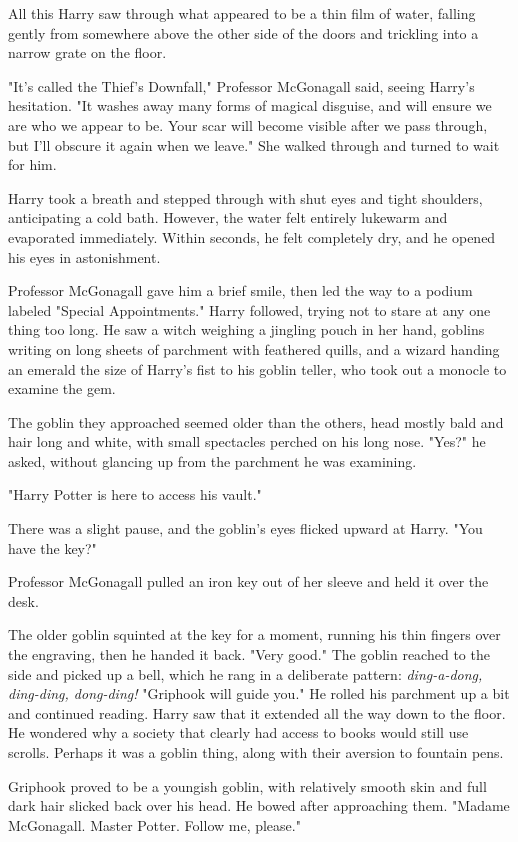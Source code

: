 All this Harry saw through what appeared to be a thin film
of water, falling gently from somewhere above the other
side of the doors and trickling into a narrow grate on the floor.

"It's called the Thief's Downfall," Professor McGonagall said,
seeing Harry's hesitation. "It washes away many forms of
magical disguise, and will ensure we are who we appear
to be. Your scar will become visible after we pass through,
but I'll obscure it again when we leave." She walked
through and turned to wait for him.

Harry took a breath and stepped through with shut eyes and tight
shoulders, anticipating a cold bath. However, the water felt entirely
lukewarm and evaporated immediately. Within seconds, he felt completely
dry, and he opened his eyes in astonishment.

Professor McGonagall gave him a brief smile, then led the
way to a podium labeled "Special Appointments." Harry
followed, trying not to stare at any one thing too long. He
saw a witch weighing a jingling pouch in her hand, goblins
writing on long sheets of parchment with feathered quills,
and a wizard handing an emerald the size of Harry's fist
to his goblin teller, who took out a monocle to examine the gem.

The goblin they approached seemed older than the others,
head mostly bald and hair long and white, with small
spectacles perched on his long nose. "Yes?" he asked,
without glancing up from the parchment he was examining.

"Harry Potter is here to access his vault."

There was a slight pause, and the goblin's eyes flicked
upward at Harry. "You have the key?"

Professor McGonagall pulled an iron key out of her sleeve
and held it over the desk.

The older goblin squinted at the key for a
moment, running his thin fingers over the engraving,
then he handed it back. "Very good." The goblin reached to
the side and picked up a bell, which he rang in a
deliberate pattern: \emph{ding-a-dong, ding-ding, dong-ding!}
"Griphook will guide you." He rolled his parchment up a bit
and continued reading. Harry saw that it extended all the
way down to the floor. He wondered why a society that
clearly had access to books would still use scrolls. Perhaps
it was a goblin thing, along with their aversion to fountain pens.

Griphook proved to be a youngish goblin, with relatively
smooth skin and full dark hair slicked back over his head.
He bowed after approaching them. "Madame McGonagall.
Master Potter. Follow me, please."

